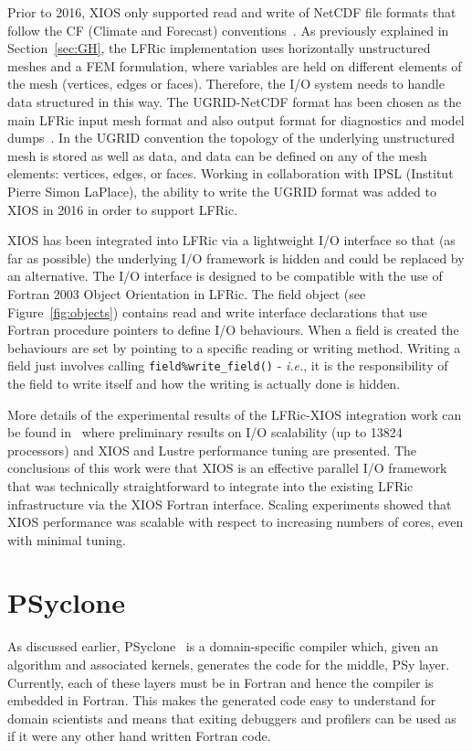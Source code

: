 \documentclass[review,times]{elsarticle}
\begin{document}
Prior to 2016, XIOS only supported read and write of NetCDF file formats that follow the CF
(Climate and Forecast) conventions~\cite{CF}.  As previously explained in Section~\ref{sec:GH},
the LFRic implementation uses horizontally unstructured meshes and a FEM formulation,
where variables are held on different elements of the mesh (vertices, edges or faces).
Therefore, the I/O system needs to handle data structured in this way. The UGRID-NetCDF
format has been chosen as the main LFRic input mesh format and also output format for
diagnostics and model dumps~\cite{UgridSpec}. In the UGRID convention the topology of the
underlying unstructured mesh is stored as well as data, and data can be defined on any of
the mesh elements: vertices, edges, or faces. Working in collaboration with IPSL
(Institut Pierre Simon LaPlace), the ability to write the UGRID format was added to XIOS
in 2016 in order to support LFRic. 

XIOS has been integrated into LFRic via a lightweight I/O interface so
that (as far as possible) the underlying I/O framework is hidden and
could be replaced by an alternative.  The I/O interface is designed to
be compatible with the use of Fortran 2003 Object Orientation in
LFRic. The field object (see Figure~\ref{fig:objects}) contains read and write
interface declarations that use Fortran procedure pointers to define
I/O behaviours. When a field is created the behaviours are set by
pointing to a specific reading or writing method. Writing a field just
involves calling \verb+field%write_field()+ - {\em i.e.}, it is the
responsibility of the field to write itself and how the writing is
actually done is hidden.

More details of the experimental results of the LFRic-XIOS integration work can be
found in~\cite{Adams2018} where preliminary results on I/O scalability (up to 13824 
processors) and XIOS and Lustre performance tuning are presented. The conclusions of
this work were that XIOS is an effective parallel I/O framework that was technically
straightforward to integrate into the existing LFRic infrastructure via the XIOS
Fortran interface. Scaling experiments showed that XIOS performance was scalable with
respect to increasing numbers of cores, even with minimal tuning.

\section{\label{sec:psyclone}PSyclone}

As discussed earlier, PSyclone~\cite{psyclone} is a domain-specific
compiler which, given an algorithm and associated kernels, generates
the code for the middle, PSy layer. Currently, each of these layers
must be in Fortran and hence the compiler is embedded in
Fortran. This makes the generated code easy to understand for domain
scientists and means that exiting debuggers and profilers can be used
as if it were any other hand written Fortran code.
\end{document}
